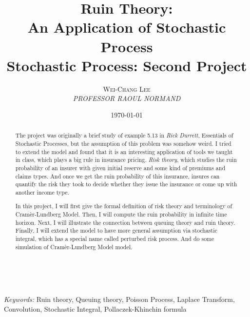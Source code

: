 \documentclass[a4paper, 12pt]{article} %
\title{\textbf{Ruin Theory:\\An Application of Stochastic Process}\\ %
Stochastic Process: Second Project} %
\author{\textsc{Wei-Chang Lee} %
\\{\textit{PROFESSOR RAOUL NORMAND}}} %
\date{\today} %
\makeatletter
\renewcommand{\maketitle}{ %
\begin{flushright} %
{\LARGE\@title} %

\vspace{50pt} %

{\large\@author} %
\\\@date %

\vspace{40pt} %
\end{flushright}
}
\makeatother
\begin{document}
\maketitle %



\begin{abstract}
The project was originally a brief study of example 5.13 in \emph{ Rick Durrett}, Essentials of Stochastic Processes, but the assumption of this problem was somehow weird. I tried to extend the model and found that it is an interesting application of tools we taught in class, which plays a big rule in insurance pricing. {\it Risk theory}, which studies the ruin probability of an insurer with given initial reserve and some kind of premiums and claims types. And once we get the ruin probability of this insurance, insures can quantify the risk they took to decide whether they issue the insurance or come up with another income type.

In this project, I will first give the formal definition of risk theory and terminology of Cram\`er-Lundberg Model.  Then, I will compute the ruin probability in infinite time horizon. Next, I will illustrate the connection between queuing theory and ruin theory. Finally, I will extend the model to have more general assumption via stochastic integral, which has a special name called perturbed risk process. And do some simulation of Cram\`er-Lundberg Model model.

\end{abstract}

\hspace*{5,6mm}\textit{Keywords:} Ruin theory, Queuing theory, Poisson Process, Laplace Transform, Convolution, Stochastic Integral, Pollaczek-Khinchin formula  %

\vspace{30pt} %

\end{document}
